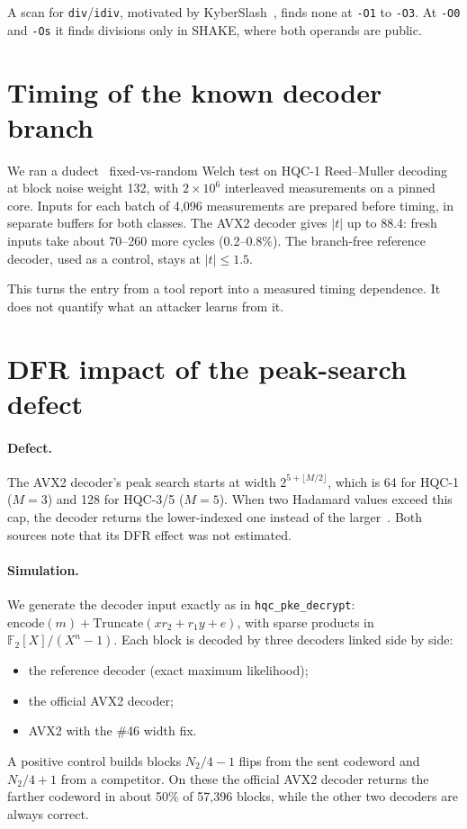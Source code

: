 \documentclass[11pt,a4paper]{article}
\begin{document}
A scan for \texttt{div}/\texttt{idiv}, motivated by KyberSlash~\cite{KyberSlash}, finds none at \texttt{-O1} to \texttt{-O3}. At \texttt{-O0} and \texttt{-Os} it finds divisions only in SHAKE, where both operands are public.

\section{Timing of the known decoder branch}\label{sec:timing}
We ran a dudect~\cite{dudect17} fixed-vs-random Welch test on HQC-1 Reed--Muller decoding at block noise weight 132, with $2\times10^6$ interleaved measurements on a pinned core. Inputs for each batch of 4{,}096 measurements are prepared before timing, in separate buffers for both classes. The AVX2 decoder gives $|t|$ up to 88.4: fresh inputs take about 70--260 more cycles (0.2--0.8\%). The branch-free reference decoder, used as a control, stays at $|t|\le 1.5$.

This turns the \cite{HQC11} entry from a tool report into a measured timing dependence. It does not quantify what an attacker learns from it.

\section{DFR impact of the peak-search defect}\label{sec:dfr}
\paragraph{Defect.} The AVX2 decoder's peak search starts at width $2^{5+\lfloor M/2\rfloor}$, which is 64 for HQC-1 ($M=3$) and 128 for HQC-3/5 ($M=5$). When two Hadamard values exceed this cap, the decoder returns the lower-indexed one instead of the larger~\cite{HQC46,pqverify}. Both sources note that its DFR effect was not estimated.

\paragraph{Simulation.} We generate the decoder input exactly as in \texttt{hqc\_pke\_decrypt}: $\mathrm{encode}(m)+\mathrm{Truncate}(x r_2 + r_1 y + e)$, with sparse products in $\mathbb{F}_2[X]/(X^n-1)$. Each block is decoded by three decoders linked side by side:
\begin{itemize}
\item the reference decoder (exact maximum likelihood);
\item the official AVX2 decoder;
\item AVX2 with the \#46 width fix.
\end{itemize}
A positive control builds blocks $N_2/4-1$ flips from the sent codeword and $N_2/4+1$ from a competitor. On these the official AVX2 decoder returns the farther codeword in about 50\% of 57{,}396 blocks, while the other two decoders are always correct.
\end{document}
